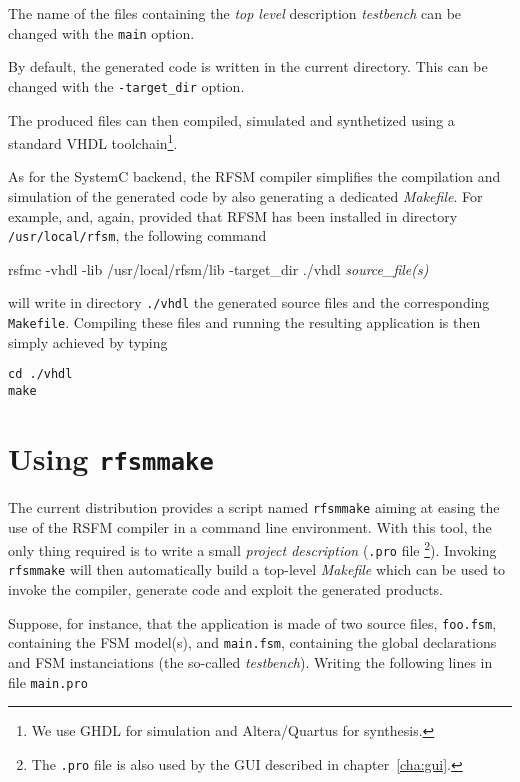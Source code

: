 \medskip The name of the files containing the \emph{top level} description \emph{testbench} can be
changed with the \verb|main| option.

\medskip
By default, the generated code is written in the current directory. This can be changed with the
\verb|-target_dir| option.

\medskip
The produced files can then compiled, simulated and synthetized using a standard VHDL
toolchain\footnote{We use GHDL for simulation and Altera/Quartus for synthesis.}.

\medskip
As for the SystemC backend, the RFSM compiler simplifies the compilation and simulation of the
generated code by also generating a dedicated \emph{Makefile}. For example,
and, again, provided that RFSM has been installed in directory \verb|/usr/local/rfsm|, the following
command

\begin{FVerbatim}[commandchars=\\\{\}]
rsfmc -vhdl -lib /usr/local/rfsm/lib -target_dir ./vhdl \emph{source_file(s)}
\end{FVerbatim}

will write in directory \verb|./vhdl| the generated source files and the corresponding
\verb|Makefile|. Compiling these files and running the resulting application is then simply achieved
by typing

\begin{verbatim}
cd ./vhdl
make 
\end{verbatim}

\section{Using \texttt{rfsmmake}}
\label{sec:rfsmmake}

The current distribution provides a script named \verb|rfsmmake| aiming at easing the use of the
RSFM compiler in a command line environment. With this tool, the only thing required is to write a
small \emph{project description} (\verb|.pro| file
\footnote{The \texttt{.pro} file is also used by the GUI described in chapter~\ref{cha:gui}.}).
Invoking \verb|rfsmmake| will then
automatically build a top-level \emph{Makefile} which can be used to invoke the compiler, generate
code and exploit the generated products.

Suppose, for instance, that the application is made of two source files, \verb|foo.fsm|, containing the FSM model(s), and
\verb|main.fsm|, containing the global declarations and FSM instanciations (the so-called
\emph{testbench}). Writing the following lines in file \verb|main.pro|

